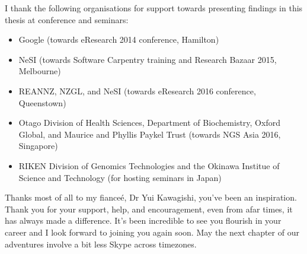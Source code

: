 I thank the following organisations for support towards presenting findings in this thesis at conference and seminars:

\begin{itemize}

\item
Google (towards eResearch 2014 conference, Hamilton)

\item
NeSI (towards Software Carpentry training and Research Bazaar 2015, Melbourne)

\item
REANNZ, NZGL, and NeSI (towards eResearch 2016 conference, Queenstown)

\item
Otago Division of Health Sciences, Department of Biochemistry, Oxford Global, and Maurice and Phyllis Paykel Trust (towards NGS Asia 2016, Singapore)

\item
RIKEN Division of Genomics Technologies and the Okinawa Institue of Science and Technology (for hosting seminars in Japan)

\end{itemize}

Thanks most of all to my fiance\'{e}, Dr Yui Kawagishi, you've been an inspiration. Thank you for your support, help, and encouragement, even from afar times, it has always made a difference. It's been incredible to see you flourish in your career and I look forward to joining you again soon. May the next chapter of our adventures involve a bit less Skype across timezones.
